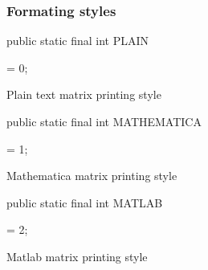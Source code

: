 \subsubsection*{Formating styles}
\begin{code}

   public static final int PLAIN\begin{hide} = 0; \end{hide}
\end{code}
\begin{tabb}   Plain text matrix printing style
\end{tabb}
\begin{code}

   public static final int MATHEMATICA\begin{hide} = 1; \end{hide}
\end{code}
\begin{tabb}   Mathematica matrix printing style
\end{tabb}
\begin{code}

   public static final int MATLAB\begin{hide} = 2; \end{hide}
\end{code}
  \begin{tabb} Matlab matrix printing style
  \end{tabb}

